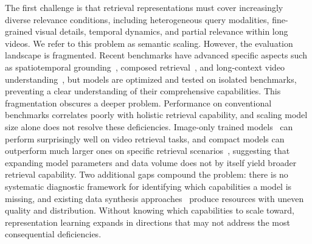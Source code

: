 The first challenge is that retrieval representations must cover increasingly diverse relevance conditions, including heterogeneous query modalities, fine-grained visual details, temporal dynamics, and partial relevance within long videos. We refer to this problem as semantic scaling. However, the evaluation landscape is fragmented. Recent benchmarks have advanced specific aspects such as spatiotemporal grounding~\cite{xu2025carebench}, composed retrieval~\cite{ventura2024covr}, and long-context video understanding~\cite{cai2025lovr}, but models are optimized and tested on isolated benchmarks, preventing a clear understanding of their comprehensive capabilities. This fragmentation obscures a deeper problem. Performance on conventional benchmarks correlates poorly with holistic retrieval capability, and scaling model size alone does not resolve these deficiencies. Image-only trained models~\cite{Zhang_2025_CVPR} can perform surprisingly well on video retrieval tasks, and compact models can outperform much larger ones on specific retrieval scenarios~\cite{wang2024internvideo2}, suggesting that expanding model parameters and data volume does not by itself yield broader retrieval capability. Two additional gaps compound the problem: there is no systematic diagnostic framework for identifying which capabilities a model is missing, and existing data synthesis approaches~\cite{chen2023vast,chai2024auroracap} produce resources with uneven quality and distribution. Without knowing which capabilities to scale toward, representation learning expands in directions that may not address the most consequential deficiencies.

